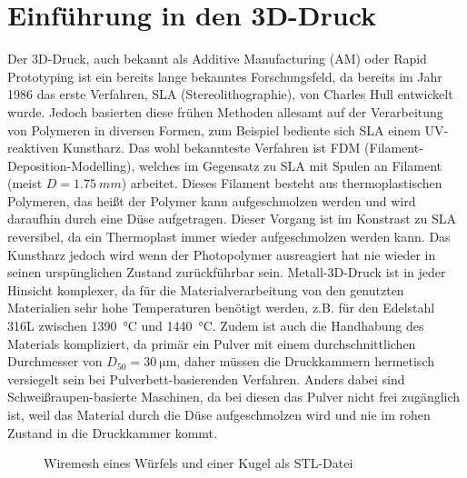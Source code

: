 \documentclass[main.tex]{subfiles}
\begin{document}
\section{Einführung in den 3D-Druck}
Der 3D-Druck, auch bekannt als Additive Manufacturing (AM) oder Rapid Prototyping ist ein bereits lange bekanntes Forschungsfeld, da bereits im Jahr 1986 das erste Verfahren, SLA (Stereolithographie), von Charles Hull entwickelt wurde. Jedoch basierten diese frühen Methoden allesamt auf der Verarbeitung von Polymeren in diversen Formen, zum Beispiel bediente sich SLA einem UV-reaktiven Kunstharz. Das wohl bekannteste Verfahren ist FDM (Filament-Deposition-Modelling), welches im Gegensatz zu SLA mit Spulen an Filament (meist $D=\qty{1.75}{mm}$) arbeitet. Dieses Filament besteht aus thermoplastischen Polymeren, das heißt der Polymer kann aufgeschmolzen werden und wird daraufhin durch eine Düse aufgetragen. Dieser Vorgang ist im Konstrast zu SLA reversibel, da ein Thermoplast immer wieder aufgeschmolzen werden kann.\parencite{BHATIA20231060} Das Kunstharz jedoch wird wenn der Photopolymer ausreagiert hat nie wieder in seinen urspünglichen Zustand zurückführbar sein.\parencite{FACUNDO_1}
Metall-3D-Druck ist in jeder Hinsicht komplexer, da für die Materialverarbeitung von den genutzten Materialien sehr hohe Temperaturen benötigt werden, z.B. für den Edelstahl 316L zwischen \qty{1390}{\celsius} und \qty{1440}{\degreeCelsius}\parencite{610LSTEEL}. Zudem ist auch die Handhabung des Materials kompliziert, da primär ein Pulver mit einem durchschnittlichen Durchmesser von $D_{50}=\SI{30}{\micro\meter}$\parencite[~S.3]{ZAKRZEWSKI2020115}, daher müssen die Druckkammern hermetisch versiegelt sein bei Pulverbett-basierenden Verfahren.
Anders dabei sind Schweißraupen-basierte Maschinen, da bei diesen das Pulver nicht frei zugänglich ist, weil das Material durch die Düse aufgeschmolzen wird und nie im rohen Zustand in die Druckkammer kommt.

\begin{figure}[h!]
\begin{center}
	\caption{Wiremesh eines Würfels und einer Kugel als STL-Datei}
	\label{img:stl_1}
\end{center}
\end{figure}	
\end{document}
